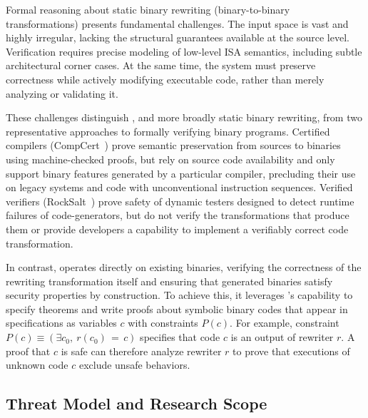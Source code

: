 
Formal reasoning about static binary rewriting (\ie binary-to-binary transformations) presents fundamental challenges. The input space is vast and highly irregular, lacking the structural guarantees available at the source level. Verification requires precise modeling of low-level ISA semantics, including subtle architectural corner cases. At the same time, the system must preserve correctness while actively modifying executable code, rather than merely analyzing or validating it.

These challenges distinguish \pname, and more broadly static binary rewriting, from two representative approaches to formally verifying binary programs.
%
Certified compilers (\eg CompCert~\cite{compcert}) prove semantic preservation from sources to binaries using machine-checked proofs, but rely on source code availability and only support binary features generated by a particular compiler, precluding their use on legacy systems and code with unconventional instruction sequences.
%
Verified verifiers (\eg RockSalt~\cite{rocksalt}) prove safety of dynamic testers designed to detect runtime failures of code-generators, but do not verify the transformations that produce them or provide developers a capability to implement a verifiably correct code transformation.

In contrast, \pname operates directly on existing binaries, verifying the correctness of the rewriting transformation itself and ensuring that generated binaries satisfy security properties by construction.
%
To achieve this, it leverages \Picinae's capability to specify theorems and write proofs about symbolic binary codes that appear in specifications as variables $c$ with constraints $P(c)$.
For example, constraint $P(c)\equiv(\exists c_0,\ r(c_0)\,{=}\,c)$ specifies that code $c$ is an output of rewriter $r$.
  A proof that $c$ is safe can therefore analyze rewriter $r$ to prove that executions of unknown code $c$ exclude unsafe behaviors.

\subsection{Threat Model and Research Scope}


